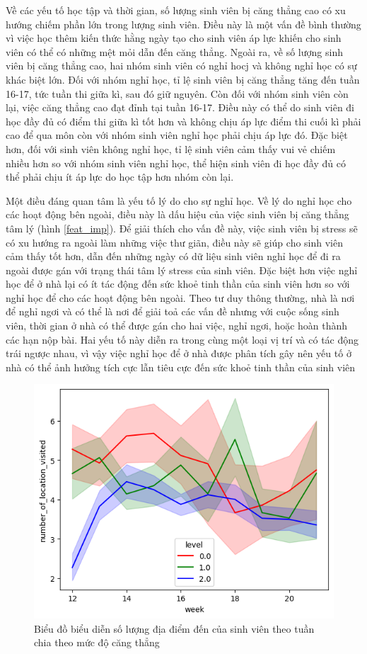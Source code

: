 Về các yếu tố học tập và thời gian, số lượng sinh viên bị căng thẳng cao có xu hướng chiếm phần lớn trong lượng sinh viên. Điều này là một vấn đề bình thường vì việc học thêm kiến thức hằng ngày tạo cho sinh viên áp lực khiến cho sinh viên có thể có những mệt mỏi dẫn đến căng thẳng. Ngoài ra, về số lượng sinh viên bị căng thẳng cao, hai nhóm sinh viên có nghỉ hocj và không nghỉ học có sự khác biệt lớn. Đối với nhóm nghỉ học, tỉ lệ sinh viên bị căng thẳng tăng đến tuần 16-17, tức tuần thi giữa kì, sau đó giữ nguyên. Còn đối với nhóm sinh viên còn lại, việc căng thẳng cao đạt đỉnh tại tuần 16-17. Điều này có thể do sinh viên đi học đầy đủ có điểm thi giữa kì tốt hơn và không chịu áp lực điểm thi cuối kì phải cao để qua môn còn với nhóm sinh viên nghỉ học phải chịu áp lực đó. Đặc biệt hơn, đối với sinh viên không nghỉ học, tỉ lệ sinh viên cảm thấy vui vẻ chiếm nhiều hơn so với nhóm sinh viên nghỉ học, thể hiện sinh viên đi học đầy đủ có thể phải chịu ít áp lực do học tập hơn nhóm còn lại. 

Một điều đáng quan tâm là yếu tố lý do cho sự nghỉ học. Về lý do nghỉ học cho các hoạt động bên ngoài, điều này là dấu hiệu của việc sinh viên bị căng thẳng tâm lý (hình \ref{feat_imp}). Để giải thích cho vấn đề này, việc sinh viên bị stress sẽ có xu hướng ra ngoài làm những việc thư giãn, điều này sẽ giúp cho sinh viên cảm thấy tốt hơn, dẫn đến những ngày có dữ liệu sinh viên nghỉ học để đi ra ngoài được gán với trạng thái tâm lý stress của sinh viên. Đặc biệt hơn việc nghỉ học để ở nhà lại có ít tác động đến sức khoẻ tinh thần của sinh viên hơn so với nghỉ học để cho các hoạt động bên ngoài. Theo tư duy thông thường, nhà là nơi để nghỉ ngơi và có thể là nơi để giải toả các vấn đề nhưng với cuộc sống sinh viên, thời gian ở nhà có thể được gán cho hai việc, nghỉ ngơi, hoặc hoàn thành các hạn nộp bài. Hai yếu tố này diễn ra trong cùng một loại vị trí và có tác động trái ngược nhau, vì vậy việc nghỉ học để ở nhà được phân tích gây nên yếu tố ở nhà có thể ảnh hưởng tích cực lẫn tiêu cực đến sức khoẻ tinh thần của sinh viên

\begin{figure}[!ht]
    \centering
    \includegraphics[width=0.75\linewidth]{num_of_loc_by_week.png}
    \caption{Biểu đồ biểu diễn số lượng địa điểm đến của sinh viên theo tuần chia theo mức độ căng thẳng}
    \label{num_of_loc_week}
\end{figure}

